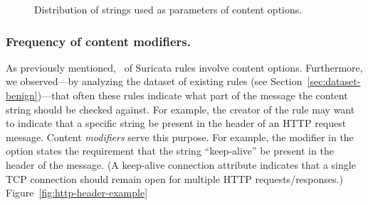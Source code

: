 \documentclass[sigconf,review, anonymous]{acmart}
\begin{document}
\begin{figure}[t!]
  \centering
  \caption{\label{fig:distribution-strings}Distribution of strings
    used as parameters of content options.}
\end{figure}

\subsubsection{Frequency of content modifiers.} As previously
mentioned, \percRulesWithContent\ of Suricata rules involve content
options. Furthermore, we observed---by analyzing the dataset of
existing rules (see Section~\ref{sec:dataset-benign})---that often
these rules indicate what part of the message the content string
should be checked against.  For example, the
creator of the rule may want to indicate that a specific string be
present in the header of an HTTP request message. Content
\emph{modifiers} serve this purpose. For example, the modifier
 in the option  states the requirement that the string ``keep-alive''
be present in the header of the message. (A keep-alive connection
attribute indicates that a single TCP connection should remain open
for multiple HTTP requests/responses.)
Figure~\ref{fig:http-header-example}
\end{document}
